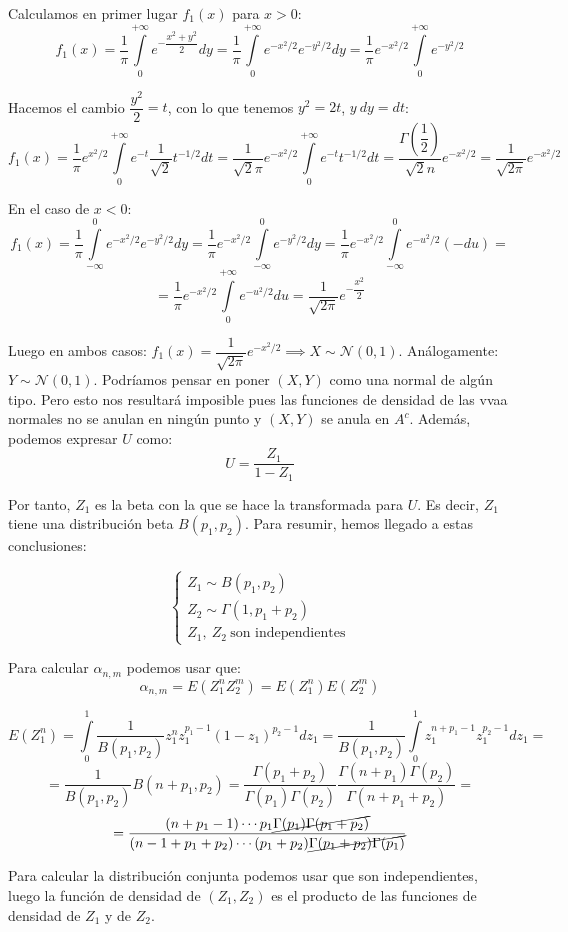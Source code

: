 \documentclass[openany]{book}
\begin{document}
\begin{exercise}
    $  $\\

    Calculamos en primer lugar $ f_{1}(x) $ para $ x>0 $:
    $$f_{1}(x) = \dfrac{1}{\pi} \int\limits_{0}^{+\infty} e^{-\dfrac{x^2+y^2}{2}}dy = \dfrac{1}{\pi}\int\limits_{0}^{+\infty}e^{-x^2/2}e^{-y^2/2}dy = \dfrac{1}{\pi} e^{-x^2/2} \int\limits_{0}^{+\infty}e^{-y^2/2} $$

    Hacemos el cambio $ \dfrac{y^2}{2} = t $, con lo que tenemos $ y^2 = 2t $, $ y\ dy =dt  $:
    $$ f_{1}(x) = \dfrac{1}{\pi}e^{x^2/2} \int\limits_{0}^{+\infty}e^{-t}\dfrac{1}{\sqrt{2}}t^{-1/2} dt = \dfrac{1}{\sqrt{2}\pi} e^{-x^2/2}\int\limits_{0}^{+\infty}e^{-t}t^{-1/2}dt = \dfrac{\Gamma(\dfrac{1}{2})}{\sqrt{2}n}e^{-x^2/2} = \dfrac{1}{\sqrt{2\pi}}e^{-x^2/2} $$

    En el caso de $ x<0 $:
    $$ f_{1}(x) = \dfrac{1}{\pi}\int\limits_{-\infty}^{0}e^{-x^2/2}e^{-y^2/2}dy = \dfrac{1}{\pi}e^{-x^2/2}\int\limits_{-\infty}^{0}e^{-y^2/2}dy = \dfrac{1}{\pi}e^{-x^2/2}\int\limits_{-\infty}^{0}e^{-u^2/2}(-du) = $$
    $$ =  \dfrac{1}{\pi}e^{-x^2/2}\int\limits_{0}^{+\infty}e^{-u^2/2}du = \dfrac{1}{\sqrt{2\pi}}e^{-\dfrac{x^2}{2}} $$

    Luego en ambos casos: $ f_{1}(x) = \dfrac{1}{\sqrt{2\pi}}e^{-x^2/2} \implies X \sim \mathcal{N}(0,1) $. Análogamente: $ Y \sim \mathcal{N}(0,1) $. Podríamos pensar en poner $ (X,Y) $ como una normal de algún tipo. Pero esto nos resultará imposible pues las funciones de densidad de las vvaa normales no se anulan en ningún punto y $ (X,Y) $ se anula en $ A ^{c} $. Además, podemos expresar $ U $ como:
    $$ U = \dfrac{Z_1}{1-Z_1} $$

    Por tanto, $ Z_1 $ es la beta con la que se hace la transformada para $ U $. Es decir, $ Z_1 $ tiene una distribución beta $ B(p_1,p_2) $. Para resumir, hemos llegado a estas conclusiones:

    $$ \left\{
    \begin{array}{l}
        Z_1 \sim B(p_1,p_2) \\ 
        Z_2 \sim \Gamma(1,p_1+p_2) \\ 
        Z_1,\ Z_2\ \text{son independientes}
    \end{array}
    \right. $$

    Para calcular $ \alpha_{n,m} $ podemos usar que:
    $$ \alpha_{n,m} = E(Z_1^{n}Z_2^{m}) = E(Z_1^{n})E(Z_2^{m}) $$

    $$ E(Z_1^{n}) = \int\limits_{0}^{1}\dfrac{1}{B(p_1,p_2)}z_1^{n}z_1^{p_1-1}(1-z_1)^{p_2-1}dz_1 = \dfrac{1}{B(p_1,p_2)} \int\limits_{0}^{1} z_1^{n+p_1-1}z_1^{p_2-1}dz_1 = $$
    $$= \dfrac{1}{B(p_1,p_2)} B(n+p_1,p_2) = \dfrac{\Gamma(p_1+p_2)}{\Gamma(p_1)\Gamma(p_2)} \dfrac{\Gamma(n+p_1)\Gamma(p_2)}{\Gamma(n+p_1+p_2)} = $$
    $$ =\dfrac{(n+p_1-1)\cdots p_1 \cancel{\Gamma(p_1)\Gamma(p_1+p_2)}}{(n-1+p_1+p_2)\cdots (p_1+p_2)\cancel{\Gamma(p_1+p_2)\Gamma(p_1)}}  $$

    Para calcular la distribución conjunta podemos usar que son independientes, luego la función de densidad de $(Z_1,Z_2) $ es el producto de las funciones de densidad de $ Z_1 $ y de $ Z_2 $.


\end{exercise}
\end{document}
